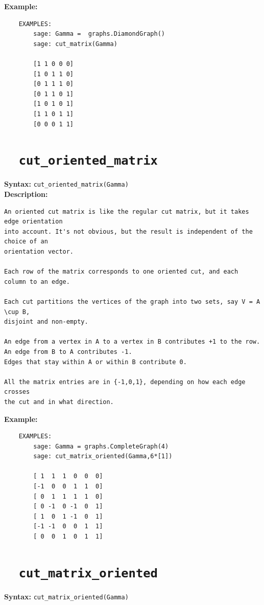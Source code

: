 \documentclass{article}
\begin{document}
\textbf{Example:}
\begin{verbatim}
    EXAMPLES:
        sage: Gamma =  graphs.DiamondGraph()
        sage: cut_matrix(Gamma)

        [1 1 0 0 0]
        [1 0 1 1 0]
        [0 1 1 1 0]
        [0 1 1 0 1]
        [1 0 1 0 1]
        [1 1 0 1 1]
        [0 0 0 1 1]
\end{verbatim}


\section{\tt \ \ cut\_oriented\_matrix}

\textbf{Syntax:} \verb}cut_oriented_matrix(Gamma)}\\

\textbf{Description:}
\begin{verbatim}
An oriented cut matrix is like the regular cut matrix, but it takes edge orientation 
into account. It's not obvious, but the result is independent of the choice of an 
orientation vector.

Each row of the matrix corresponds to one oriented cut, and each column to an edge.

Each cut partitions the vertices of the graph into two sets, say V = A \cup B, 
disjoint and non-empty.

An edge from a vertex in A to a vertex in B contributes +1 to the row.
An edge from B to A contributes -1.
Edges that stay within A or within B contribute 0.

All the matrix entries are in {-1,0,1}, depending on how each edge crosses 
the cut and in what direction.
\end{verbatim}

\textbf{Example:}
\begin{verbatim}
    EXAMPLES:
        sage: Gamma = graphs.CompleteGraph(4)
        sage: cut_matrix_oriented(Gamma,6*[1])

        [ 1  1  1  0  0  0]
        [-1  0  0  1  1  0]
        [ 0  1  1  1  1  0]
        [ 0 -1  0 -1  0  1]
        [ 1  0  1 -1  0  1]
        [-1 -1  0  0  1  1]
        [ 0  0  1  0  1  1]
\end{verbatim}

\section{\tt \ \ cut\_matrix\_oriented}

\textbf{Syntax:} \verb}cut_matrix_oriented(Gamma)}\\
\end{document}
